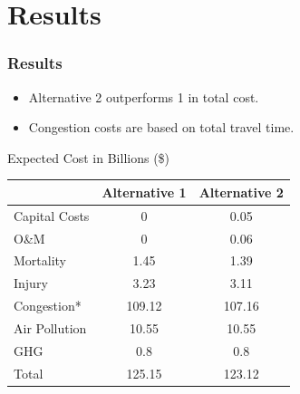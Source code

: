 \documentclass{beamer}
\begin{document}
\section{Results}
\begin{frame}
  \frametitle{Results}
      \begin{itemize}
        \item Alternative 2 outperforms 1 in total cost.
        \item Congestion costs are based on total travel time.
      \end{itemize}
    \begin{block}{Expected Cost in Billions (\$)}
      \centering \footnotesize
      \begin{tabular}{l c c}
        \hline
        & Alternative 1 & Alternative 2\\
        \hline\hline
        Capital Costs & 0 & 0.05\\
        O\&M & 0 & 0.06\\
        Mortality & 1.45 & 1.39\\
        Injury & 3.23 & 3.11\\
        Congestion* & 109.12 & 107.16\\
        Air Pollution & 10.55 & 10.55\\
        GHG & 0.8 & 0.8\\
        \hline
        Total & 125.15 & 123.12\\
        \hline\hline
      \end{tabular}
    \end{block}
\end{frame}
\end{document}
